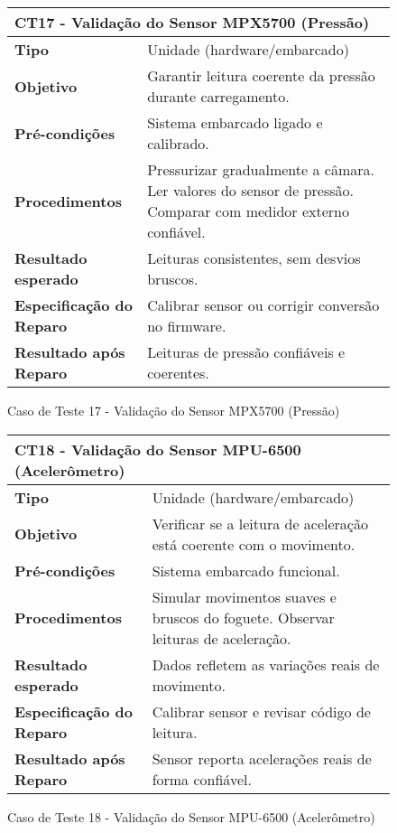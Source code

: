 \begin{figure}[H]
    \centering
\begin{longtable}{|p{}|p{}|}
\hline
\multicolumn{2}{|l|}{\textbf{CT17 - Validação do Sensor MPX5700 (Pressão)}} \\
\hline
\textbf{Tipo} & Unidade (hardware/embarcado) \\
\hline
\textbf{Objetivo} & Garantir leitura coerente da pressão durante carregamento. \\
\hline
\textbf{Pré-condições} & Sistema embarcado ligado e calibrado. \\
\hline
\textbf{Procedimentos} &  Pressurizar gradualmente a câmara.  Ler valores do sensor de pressão.  Comparar com medidor externo confiável.  \\
\hline
\textbf{Resultado esperado} & Leituras consistentes, sem desvios bruscos. \\
\hline
\textbf{Especificação do Reparo} & Calibrar sensor ou corrigir conversão no firmware. \\
\hline
\textbf{Resultado após Reparo} & Leituras de pressão confiáveis e coerentes. \\
\hline
\end{longtable}
\caption{Caso de Teste 17 - Validação do Sensor MPX5700 (Pressão)}
\label{fig_ct14_validacao_sensor_mpx5700}
\end{figure}

\begin{figure}[H]
    \centering
\begin{longtable}{|p{}|p{}|}
\hline
\multicolumn{2}{|l|}{\textbf{CT18 - Validação do Sensor MPU-6500 (Acelerômetro)}} \\
\hline
\textbf{Tipo} & Unidade (hardware/embarcado) \\
\hline
\textbf{Objetivo} & Verificar se a leitura de aceleração está coerente com o movimento. \\
\hline
\textbf{Pré-condições} & Sistema embarcado funcional. \\
\hline
\textbf{Procedimentos} &  Simular movimentos suaves e bruscos do foguete.  Observar leituras de aceleração.  \\
\hline
\textbf{Resultado esperado} & Dados refletem as variações reais de movimento. \\
\hline
\textbf{Especificação do Reparo} & Calibrar sensor e revisar código de leitura. \\
\hline
\textbf{Resultado após Reparo} & Sensor reporta acelerações reais de forma confiável. \\
\hline
\end{longtable}
\caption{Caso de Teste 18 - Validação do Sensor MPU-6500 (Acelerômetro)}
\label{fig_ct15_validacao_sensor_mpu6500}
\end{figure}

